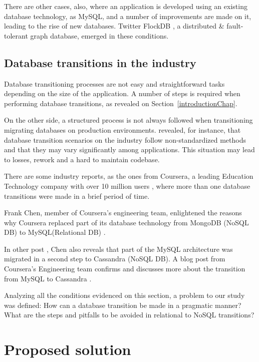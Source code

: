 There are other cases, also, where an application is developed using an existing database technology, as MySQL, and a number of improvements are made on it, leading to the rise of new databases. Twitter FlockDB \cite{flockdb}, a distributed \& fault-tolerant graph database, emerged in these conditions. 


\subsection{Database transitions in the industry}

Database transitioning processes are not easy and straightforward tasks depending on the size of the application. A number of steps is required when performing database transitions, as revealed on Section~\ref{introductionChap}.

On the other side, a structured process is not always followed when transitioning migrating databases on production environments. \cite{fabioMartinSM} revealed, for instance, that database transition scenarios on the industry follow non-standardized methods and that they may vary significantly among applications. This situation may lead to losses, rework and a hard to maintain codebase.

There are some industry reports, as the ones from Coursera, a leading Education Technology company with over 10 million users \cite{courserawiki}, where more than one database transitions were made in a brief period of time.  

Frank Chen, member of Coursera's engineering team, enlightened the reasons why Coursera replaced part of its database technology from MongoDB (NoSQL DB) to MySQL(Relational DB) \cite{coursera-mongodb-mysql} . 

In other post \cite{coursera-mongodb-mysql2}, Chen also reveals that part of the MySQL architecture was migrated in a second step to Cassandra (NoSQL DB). A blog post from Coursera's Engineering team confirms and discusses more about the transition from MySQL to Cassandra \cite{coursera-mysql-cassandra}. 

Analyzing all the conditions evidenced on this section, a problem to our study was defined: How can a database transition be made in a pragmatic manner? What are the steps and pitfalls to be avoided in relational to NoSQL transitions? 

\section{Proposed solution}

